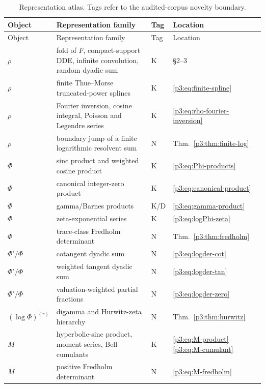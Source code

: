 \documentclass[11pt]{article}
\theoremstyle{definition}
\theoremstyle{remark}
\newcommand{\statusknown}{\textsf{K}}
\newcommand{\statusderived}{\textsf{D}}
\newcommand{\statusnew}{\textsf{N}}
\begin{document}
\small
\begin{longtable}{@{}p{}p{}p{}p{}@{}}
\caption{Representation atlas.  Tags refer to the audited-corpus novelty boundary.}
\label{p3:tab:atlas}\\
\toprule
Object & Representation family & Tag & Location \\
\midrule
\endfirsthead
\toprule
Object & Representation family & Tag & Location \\
\midrule
\endhead
\(\rho\) & fold of \(F\), compact-support DDE, infinite convolution, random dyadic sum & \statusknown & \S2--3 \\
\(\rho\) & finite Thue--Morse truncated-power splines & \statusknown & \eqref{p3:eq:finite-spline} \\
\(\rho\) & Fourier inversion, cosine integral, Poisson and Legendre series & \statusknown & \eqref{p3:eq:rho-fourier-inversion} \\
\(\rho\) & boundary jump of a finite logarithmic resolvent sum & \statusnew & Thm.~\ref{p3:thm:finite-log} \\
\(\Phi\) & sinc product and weighted cosine product & \statusknown & \eqref{p3:eq:Phi-products} \\
\(\Phi\) & canonical integer-zero product & \statusknown & \eqref{p3:eq:canonical-product} \\
\(\Phi\) & gamma/Barnes products & \statusknown/\statusderived & \eqref{p3:eq:gamma-product} \\
\(\Phi\) & zeta-exponential series & \statusknown & \eqref{p3:eq:logPhi-zeta} \\
\(\Phi\) & trace-class Fredholm determinant & \statusnew & Thm.~\ref{p3:thm:fredholm} \\
\(\Phi'/\Phi\) & cotangent dyadic sum & \statusnew & \eqref{p3:eq:logder-cot} \\
\(\Phi'/\Phi\) & weighted tangent dyadic sum & \statusnew & \eqref{p3:eq:logder-tan} \\
\(\Phi'/\Phi\) & valuation-weighted partial fractions & \statusnew & \eqref{p3:eq:logder-zero} \\
\((\log\Phi)^{(r)}\) & digamma and Hurwitz-zeta hierarchy & \statusnew & Thm.~\ref{p3:thm:hurwitz} \\
\(M\) & hyperbolic-sinc product, moment series, Bell cumulants & \statusknown & \eqref{p3:eq:M-product}--\eqref{p3:eq:M-cumulant} \\
\(M\) & positive Fredholm determinant & \statusnew & \eqref{p3:eq:M-fredholm} \\

\end{longtable}
\end{document}
